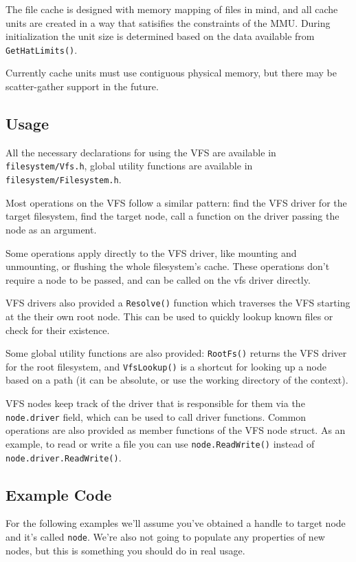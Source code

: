 The file cache is designed with memory mapping of files in mind, and all cache units are created in a way that satisifies the constraints of the MMU. During initialization the unit size is determined based on the data available from \verb|GetHatLimits()|.

Currently cache units must use contiguous physical memory, but there may be scatter-gather support in the future.

\subsection{Usage}
All the necessary declarations for using the VFS are available in \verb|filesystem/Vfs.h|, global utility functions are available in \verb|filesystem/Filesystem.h|.

Most operations on the VFS follow a similar pattern: find the VFS driver for the target filesystem, find the target node, call a function on the driver passing the node as an argument.

Some operations apply directly to the VFS driver, like mounting and unmounting, or flushing the whole filesystem's cache. These operations don't require a node to be passed, and can be called on the vfs driver directly.

VFS drivers also provided a \verb|Resolve()| function which traverses the VFS starting at the their own root node. This can be used to quickly lookup known files or check for their existence.

Some global utility functions are also provided: \verb|RootFs()| returns the VFS driver for the root filesystem, and \verb|VfsLookup()| is a shortcut for looking up a node based on a path (it can be absolute, or use the working directory of the context).

VFS nodes keep track of the driver that is responsible for them via the \verb|node.driver| field, which can be used to call driver functions. Common operations are also provided as member functions of the VFS node struct. As an example, to read or write a file you can use \verb|node.ReadWrite()| instead of \verb|node.driver.ReadWrite()|.

\subsection{Example Code}
For the following examples we'll assume you've obtained a handle to target node and it's called \verb|node|. We're also not going to populate any properties of new nodes, but this is something you should do in real usage.

